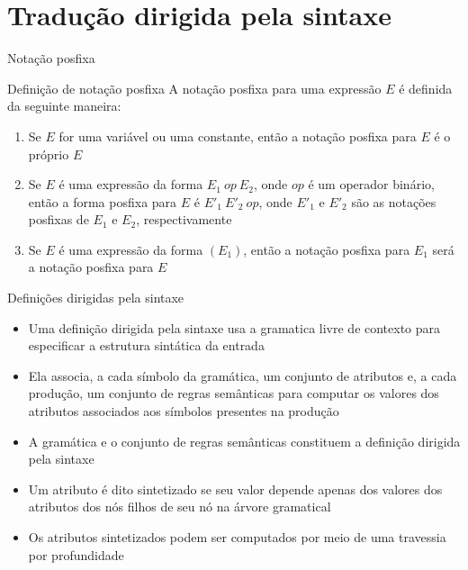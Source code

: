 \section{Tradução dirigida pela sintaxe}

\begin{frame}[fragile]{Notação posfixa}

    \begin{block}{Definição de notação posfixa}
    A notação posfixa para uma expressão $E$ é definida da seguinte maneira:

    \begin{enumerate}
        \item Se $E$ for uma variável ou uma constante, então a notação posfixa para $E$ é o próprio $E$

        \item Se $E$ é uma expressão da forma $E_1\ op\ E_2$, onde $op$ é um operador binário, então a forma posfixa para $E$ é $E'_1\ E'_2\ op$, onde $E'_1$ e 
            $E'_2$ são as notações posfixas de $E_1$ e $E_2$, respectivamente

        \item Se $E$ é uma expressão da forma $(E_1)$, então a notação posfixa para $E_1$ será a notação posfixa para $E$
    \end{enumerate}
    \end{block}

\end{frame}

\begin{frame}[fragile]{Definições dirigidas pela sintaxe}

    \begin{itemize}
        \item Uma definição dirigida pela sintaxe usa a gramatica livre de contexto para especificar a estrutura sintática da entrada

        \item Ela associa, a cada símbolo da gramática, um conjunto de atributos e, a cada produção, um conjunto de regras semânticas para computar os valores
            dos atributos associados aos símbolos presentes na produção

        \item A gramática e o conjunto de regras semânticas constituem a definição dirigida pela sintaxe

        \item Um atributo é dito sintetizado se seu valor depende apenas dos valores dos atributos dos nós filhos de seu nó na árvore gramatical

        \item Os atributos sintetizados podem ser computados por meio de uma travessia por profundidade
    \end{itemize}

\end{frame}

